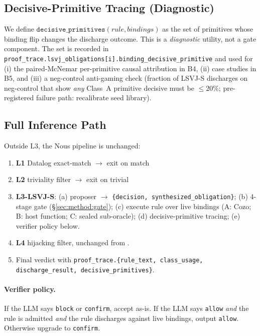 \documentclass{article}
\theoremstyle{definition}
\begin{document}
\subsection{Decisive-Primitive Tracing (Diagnostic)}
\label{sec:method:tracing}
We define
$\mathtt{decisive\_primitives}(\mathit{rule}, \mathit{bindings})$ as
the set of primitives whose binding flip changes the discharge
outcome. This is a \emph{diagnostic} utility, not a gate component.
The set is recorded in
\texttt{proof\_trace.lsvj\_obligations[i].binding\_decisive\_primitive}
and used for (i) the paired-McNemar per-primitive causal attribution
in B4, (ii) case studies in B5, and (iii) a neg-control anti-gaming
check (fraction of LSVJ-S discharges on neg-control that show
\emph{any} Class~A primitive decisive must be $\le 20\%$;
pre-registered failure path: recalibrate seed library).

\subsection{Full Inference Path}
\label{sec:method:path}
Outside L3, the Nous pipeline is unchanged:
\begin{enumerate}[leftmargin=1.5em]
\item \textbf{L1} Datalog exact-match $\to$ exit on match
\item \textbf{L2} triviality filter $\to$ exit on trivial
\item \textbf{L3-LSVJ-S}: (a) proposer $\to$
\texttt{\{decision, synthesized\_obligation\}};
(b) 4-stage gate (\S\ref{sec:method:gate});
(c) execute rule over live bindings
(A: Cozo; B: host function; C: sealed sub-oracle);
(d) decisive-primitive tracing;
(e) verifier policy below.
\item \textbf{L4} hijacking filter, unchanged from
\citet{zhang2026ownerharm}.
\item Final verdict with
\texttt{proof\_trace.\{rule\_text, class\_usage, discharge\_result,
decisive\_primitives\}}.
\end{enumerate}

\paragraph{Verifier policy.}
If the LLM says \texttt{block} or \texttt{confirm}, accept as-is. If
the LLM says \texttt{allow} \emph{and} the rule is admitted \emph{and}
the rule discharges against live bindings, output \texttt{allow}.
Otherwise upgrade to \texttt{confirm}.
\end{document}

